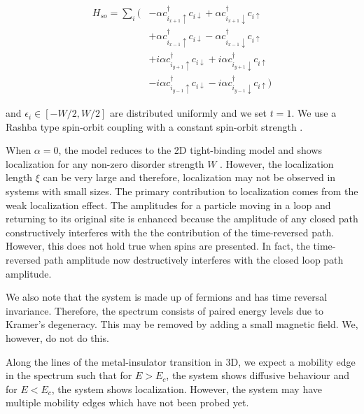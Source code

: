 \documentclass[twocolumn]{article}
\begin{document}
\begin{align*}
    H_{so} = \sum_{i}(&-\alpha c_{i_{x+1}\uparrow}^{\dagger}c_{i\downarrow}
            +\alpha c_{i_{x+1}\downarrow}^{\dagger}c_{i\uparrow} \\
    &+\alpha c_{i_{x-1}\uparrow}^{\dagger}c_{i\downarrow}
            -\alpha c_{i_{x-1}\downarrow}^{\dagger}c_{i\uparrow} \\
    &+ i\alpha c_{i_{y+1}\uparrow}^{\dagger}c_{i\downarrow}
            +i\alpha c_{i_{y+1}\downarrow}^{\dagger}c_{i\uparrow} \\
    &- i\alpha c_{i_{y-1}\uparrow}^{\dagger}c_{i\downarrow}
            -i\alpha c_{i_{y-1}\downarrow}^{\dagger} c_{i\uparrow})
\end{align*}

and $\epsilon_i \in [-W/2,W/2]$ are distributed uniformly
and we set $t = 1$. We use a Rashba type spin-orbit coupling
with a constant spin-orbit strength \cite{liuAndersonLocalizationDegenerate2016}.

When $\alpha = 0$, the model reduces to the 2D tight-binding
model and shows localization for any non-zero disorder
strength $W$ \cite{abrahamsScalingTheoryLocalization1979}.
However, the localization length $\xi$ can be very large and
therefore, localization may not be observed in systems with
small sizes. The primary contribution to localization comes
from the weak localization effect. The amplitudes for a
particle moving in a loop and returning to its original site
is enhanced because the amplitude of any closed path
constructively interferes with the the contribution of the
time-reversed path. However, this does not hold true when
spins are presented. In fact, the time-reversed path
amplitude now destructively interferes with the closed loop
path amplitude. 

We also note that the system is made up of fermions and has
time reversal invariance. Therefore, the spectrum consists
of paired energy levels due to Kramer's degeneracy. This may
be removed by adding a small magnetic field. We, however, do
not do this.

Along the lines of the metal-insulator transition in 3D, we
expect a mobility edge in the spectrum such that for $E >
E_c$, the system shows diffusive behaviour and for $E <
E_c$, the system shows localization. However, the system may
have multiple mobility edges which have not been probed yet.
\end{document}
